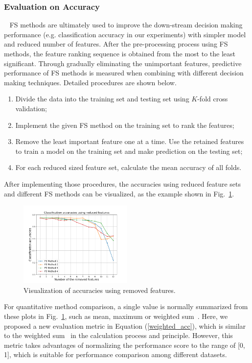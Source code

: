 \documentclass[conference]{IEEEtran}
\begin{document}
\subsubsection{\textbf{Evaluation on Accuracy}}~\label{eval_acc}
FS methods are ultimately used to improve the down-stream decision making performance (e.g. classification accuracy in our experiments) with simpler model and reduced number of features. After the pre-processing process using FS methods, the feature ranking sequence is obtained from the most to the least significant. Through gradually eliminating the unimportant features, predictive performance of FS methods is measured when combining with different decision making techniques. Detailed procedures are shown below.

\begin{enumerate}
	\item Divide the data into the training set and testing set using $K$-fold cross validation;
	\item Implement the given FS method on the training set to rank the features;
	\item Remove the least important feature one at a time. Use the retained features to train a model on the training set and make prediction on the testing set;
	\item For each reduced sized feature set, calculate the mean accuracy of all folds.
\end{enumerate}

After implementing those procedures, the accuracies using reduced feature sets and different FS methods can be visualized, as the example shown in Fig.~\ref{demonstration_acc}.

\begin{figure}[tb]
	\centering
	\includegraphics[width=0.5\textwidth]{Figures/classification_accuracy.png}
	\caption{Visualization of accuracies using removed features.}
	\label{demonstration_acc}
\end{figure}

For quantitative method comparison, a single value is normally summarized from these plots in Fig.~\ref{demonstration_acc}, such as mean, maximum or weighted sum~\cite{shen2020novel}. Here, we proposed a new evaluation metric in Equation (\ref{weighted_acc}), which is similar to the weighted sum~\cite{shen2020novel} in the calculation process and principle. However, this metric takes advantages of normalizing the performance score to the range of [0, 1], which is suitable for performance comparison among different datasets.
\end{document}

